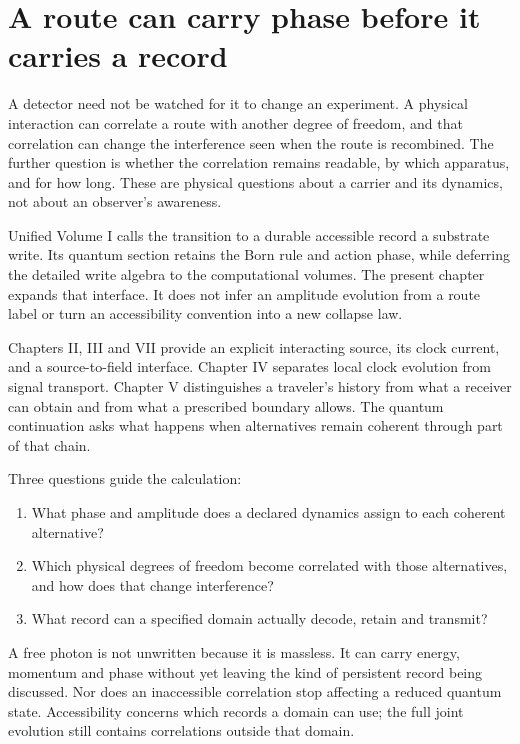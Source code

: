\section{A route can carry phase before it carries a record}
A detector need not be watched for it to change an experiment. A physical interaction can correlate a route with another degree of freedom, and that correlation can change the interference seen when the route is recombined. The further question is whether the correlation remains readable, by which apparatus, and for how long. These are physical questions about a carrier and its dynamics, not about an observer's awareness.

Unified Volume I calls the transition to a durable accessible record a substrate write.\cite{unified} Its quantum section retains the Born rule and action phase, while deferring the detailed write algebra to the computational volumes. The present chapter expands that interface. It does not infer an amplitude evolution from a route label or turn an accessibility convention into a new collapse law.

Chapters II, III and VII provide an explicit interacting source, its clock current, and a source-to-field interface. Chapter IV separates local clock evolution from signal transport. Chapter V distinguishes a traveler's history from what a receiver can obtain and from what a prescribed boundary allows.\cite{chapter1,chapter2,chapter3,chapter4,chapter5} The quantum continuation asks what happens when alternatives remain coherent through part of that chain.

Three questions guide the calculation:
\begin{enumerate}[leftmargin=*,itemsep=2pt]
\item What phase and amplitude does a declared dynamics assign to each coherent alternative?
\item Which physical degrees of freedom become correlated with those alternatives, and how does that change interference?
\item What record can a specified domain actually decode, retain and transmit?
\end{enumerate}
A free photon is not unwritten because it is massless. It can carry energy, momentum and phase without yet leaving the kind of persistent record being discussed. Nor does an inaccessible correlation stop affecting a reduced quantum state. Accessibility concerns which records a domain can use; the full joint evolution still contains correlations outside that domain.

